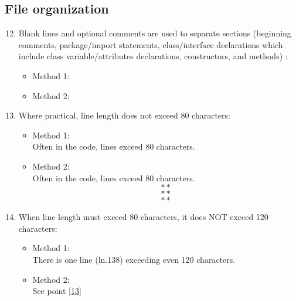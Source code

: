 \subsection{File organization}
\begin{enumerate}
	\setcounter{enumi}{11}
	\item Blank lines and optional comments are used to separate sections (beginning comments, package/import statements, class/interface declarations which include class variable/attributes declarations, constructors, and methods) :
	\begin{itemize}
		\item Method 1: \cmark
		\item Method 2: \cmark
	\end{itemize}
	\item Where practical, line length does not exceed 80 characters:\label{13}
	\begin{itemize}
		\item Method 1: \xmark \\
		Often in the code, lines exceed 80 characters.
		\item Method 2: \xmark\\
		Often in the code, lines exceed 80 characters.
		$$**$$
		$$**$$
		$$**$$
	\end{itemize}
	\item When line length must exceed 80 characters, it does NOT exceed 120 characters:
	\begin{itemize}
		\item Method 1: \xmark \\
		There is one line (ln.138) exceeding even 120 characters.
		\item Method 2: \xmark\\
		See point \ref{13}
	\end{itemize}
\end{enumerate}